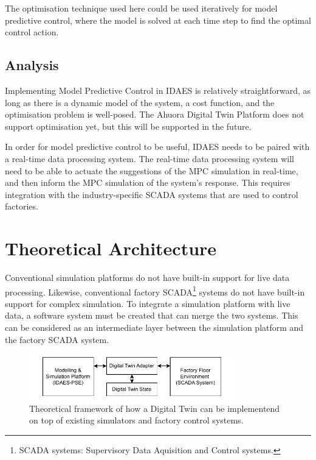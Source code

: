 The optimisation technique used here could be used iteratively for model predictive control, where the model is solved at each time step to find the optimal control action. 


\subsection{Analysis} \label{sec:optimisationcontrol}

Implementing Model Predictive Control in IDAES is relatively straightforward, as long as there is a dynamic model of the system, a cost function, and the optimisation problem is well-posed. The Ahuora Digital Twin Platform does not support optimisation yet, but this will be supported in the future.

In order for model predictive control to be useful, IDAES needs to be paired with a real-time data processing system. The real-time data processing system will need to be able to actuate the suggestions of the MPC simulation in real-time, and then inform the MPC simulation of the system's response. This requires integration with the industry-specific SCADA systems that are used to control factories.

\section{Theoretical Architecture} 

Conventional simulation platforms do not have built-in support for live data processing. Likewise, conventional factory SCADA\footnote{SCADA systems: Supervisory Data Aquisition and Control systems.} systems do not have built-in support for complex simulation. To integrate a simulation platform with live data, a software system must be created that can merge the two systems. This can be considered as an intermediate layer between the simulation platform and the factory SCADA system.


\begin{figure}[h]
    \centering
    \includegraphics[width=0.8\textwidth]{research_article/research_journal_framework_simple.pdf}
    \caption{Theoretical framework of how a Digital Twin can be implementend on top of existing simulators and factory control systems.}
    \label{fig:theoretical_framework}
\end{figure}

